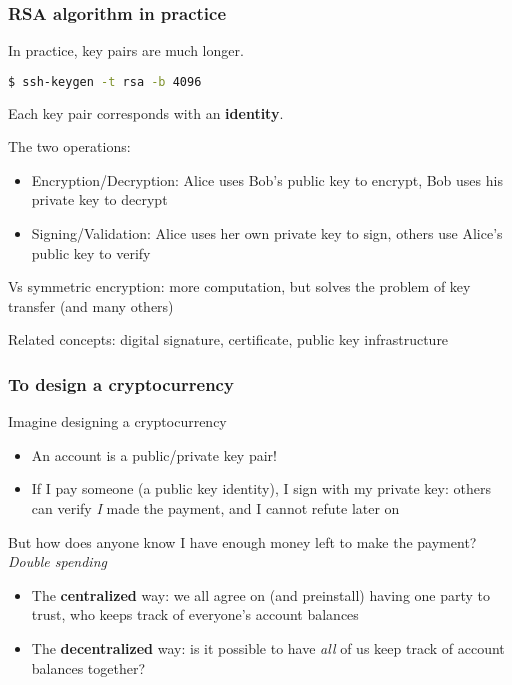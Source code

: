 \documentclass{beamer}
\begin{document}
\begin{frame}[fragile]
\frametitle{RSA algorithm in practice}

In practice, key pairs are much longer.
\begin{lstlisting}[language=bash]
  $ ssh-keygen -t rsa -b 4096
\end{lstlisting}

Each key pair corresponds with an \textbf{identity}.

\vspace{0.2in}

The two operations:
\begin{itemize}
  \item {Encryption/Decryption}: Alice uses Bob's public key to encrypt, Bob uses his private key to decrypt
  \item {Signing/Validation}: Alice uses her own private key to sign, others use Alice's public key to verify
\end{itemize}

\vspace{0.2in}
Vs symmetric encryption: more computation, but solves the problem of key transfer (and many others)

\vspace{0.2in}
Related concepts: digital signature, certificate, public key infrastructure

\end{frame}

\begin{frame}
\frametitle{To design a cryptocurrency}

Imagine designing a cryptocurrency
\begin{itemize}
  \item An account is a public/private key pair!
  \item If I pay someone (a public key identity), I sign with my private key: others can verify \textit{I} made the payment, and I cannot refute later on
\end{itemize}

But how does anyone know I have enough money left to make the payment? \textit{Double spending}
\begin{itemize}
  \item The \textbf{centralized} way: we all agree on (and preinstall) having one party to trust, who keeps track of everyone's account balances
  \item The \textbf{decentralized} way: is it possible to have \textit{all} of us keep track of account balances together?
\end{itemize}

\end{frame}
\end{document}
